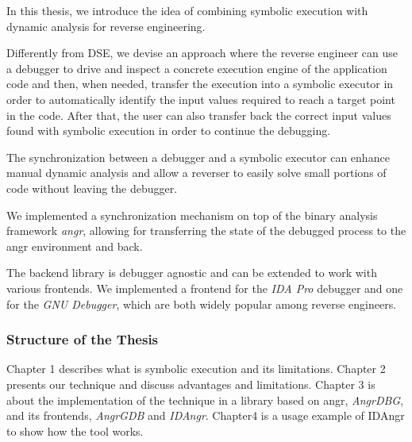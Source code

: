 In this thesis, we introduce the idea of combining symbolic execution with dynamic analysis for reverse engineering.

Differently from DSE, we devise an approach where the reverse engineer can use a debugger to drive and inspect a concrete execution engine of the application code and then, when needed, transfer the execution into a symbolic executor in order to automatically identify the input values required to reach a target point in the code. After that, the user can also transfer back the correct input values found with symbolic execution in order to continue the debugging.

The synchronization between a debugger and a symbolic executor can enhance manual dynamic analysis and allow a reverser to easily solve small portions of code without leaving the debugger.

We implemented a synchronization mechanism on top of the binary analysis framework {\em angr}, allowing for transferring the state of the debugged process to the angr environment and back.

The backend library is debugger agnostic and can be extended to work with various frontends.
We implemented a frontend for the {\em IDA Pro} debugger and one for the {\em GNU Debugger}, which are both widely popular among reverse engineers.

\subsubsection{Structure of the Thesis}

Chapter 1 describes what is symbolic execution and its limitations. Chapter 2 presents our technique and discuss advantages and limitations. Chapter 3 is about the implementation of the technique in a library based on angr, {\em AngrDBG}, and its frontends, {\em AngrGDB} and {\em IDAngr}. Chapter4 is a usage example of IDAngr to show how the tool works.
